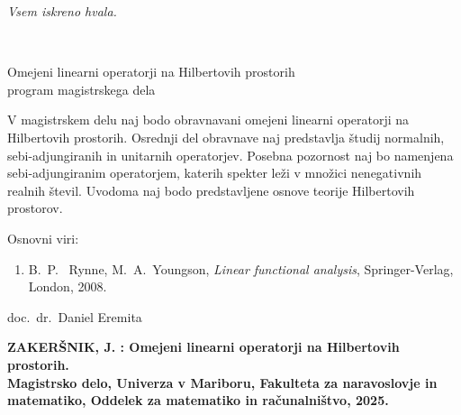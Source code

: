 \documentclass[12pt,a4paper,oneside,fleqn,openany]{book}
\begin{document}
\vspace{1cm}
\begin{sloppypar}
\textit{Vsem iskreno hvala.}
\end{sloppypar}

\vfill

~


\newpage
\begin{center}
\large
Omejeni linearni operatorji na Hilbertovih prostorih\\\small program magistrskega dela
\end{center}

V magistrskem delu naj bodo obravnavani omejeni linearni operatorji na Hilbertovih prostorih. Osrednji del obravnave naj predstavlja študij normalnih, sebi-adjungiranih in unitarnih operatorjev. Posebna pozornost naj bo namenjena sebi-adjungiranim operatorjem, katerih spekter leži v množici nenegativnih realnih števil. Uvodoma naj bodo predstavljene osnove teorije Hilbertovih prostorov.

Osnovni viri:
\begin{enumerate}
\item B.~P.~ Rynne, M.~A.~Youngson, \emph{Linear functional analysis}, Springer-Verlag, London, 2008.
\end{enumerate}

  
\vspace{1cm}
\begin{flushright}
doc.\ dr.\ Daniel Eremita\\
\end{flushright}	


\newpage
\textbf{ZAKERŠNIK, J. : Omejeni linearni operatorji na Hilbertovih prostorih.\\
Magistrsko delo, Univerza v Mariboru, Fakulteta za naravoslovje in \-ma\-te\-ma\-ti\-ko,
Oddelek za matematiko in ra\v cunalni\v stvo, 2025.}\\
\end{document}
